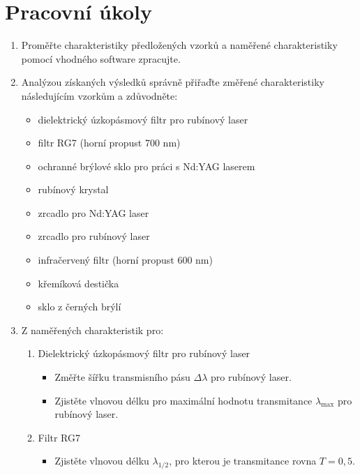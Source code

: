 
\section{Pracovní úkoly}

\begin{enumerate}
\item Proměřte charakteristiky předložených vzorků a naměřené charakteristiky pomocí
vhodného software zpracujte.

\item Analýzou získaných výsledků správně přiřaďte změřené charakteristiky následujícím
vzorkům a zdůvodněte:
	\begin{itemize}
	\item dielektrický úzkopásmový filtr pro rubínový laser
	\item filtr RG7 (horní propust 700 nm)
	\item ochranné brýlové sklo pro práci s Nd:YAG laserem
	\item rubínový krystal
	\item zrcadlo pro Nd:YAG laser
	\item zrcadlo pro rubínový laser
	\item infračervený filtr (horní propust 600 nm)
	\item křemíková destička
	\item sklo z černých brýlí
	\end{itemize}
\item Z naměřených charakteristik pro:
	\begin{enumerate}
	\item Dielektrický úzkopásmový filtr pro rubínový laser
		\begin{itemize}
		\item Změřte šířku transmisního pásu $\Delta\lambda$ pro rubínový laser.
		\item Zjistěte vlnovou délku pro maximální hodnotu transmitance $\lambda_{\mathrm{max}}$ pro rubínový laser.
		\end{itemize}
		
	\item Filtr RG7
		\begin{itemize}
		\item Zjistěte vlnovou délku $\lambda_{1/2}$, pro kterou je transmitance rovna $T = 0,5$.
		\end{itemize}
		

\end{enumerate}
\end{enumerate}
